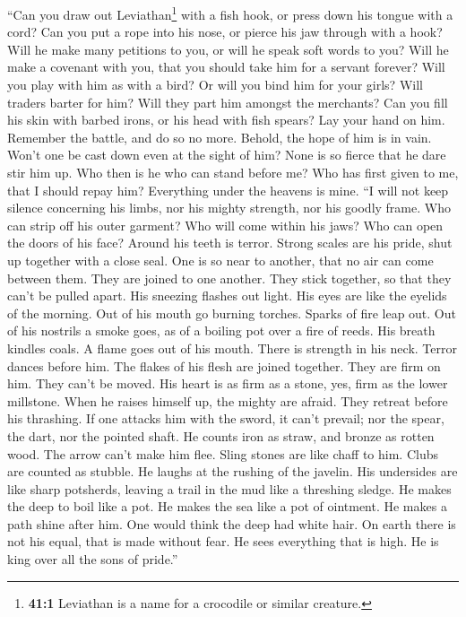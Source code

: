  ``Can you draw out Leviathan\footnote{\textbf{41:1}
  Leviathan is a name for a crocodile or similar creature.} with a fish
hook, or press down his tongue with a cord?  Can you put a
rope into his nose, or pierce his jaw through with a hook?
 Will he make many petitions to you, or will he speak soft
words to you?  Will he make a covenant with you, that you
should take him for a servant forever?  Will you play with
him as with a bird? Or will you bind him for your girls? 
Will traders barter for him? Will they part him amongst the merchants?
 Can you fill his skin with barbed irons, or his head with
fish spears?  Lay your hand on him. Remember the battle,
and do so no more.  Behold, the hope of him is in vain.
Won't one be cast down even at the sight of him?  None is
so fierce that he dare stir him up. Who then is he who can stand before
me?  Who has first given to me, that I should repay him?
Everything under the heavens is mine.  ``I will not keep
silence concerning his limbs, nor his mighty strength, nor his goodly
frame.  Who can strip off his outer garment? Who will
come within his jaws?  Who can open the doors of his
face? Around his teeth is terror.  Strong scales are his
pride, shut up together with a close seal.  One is so
near to another, that no air can come between them.  They
are joined to one another. They stick together, so that they can't be
pulled apart.  His sneezing flashes out light. His eyes
are like the eyelids of the morning.  Out of his mouth go
burning torches. Sparks of fire leap out.  Out of his
nostrils a smoke goes, as of a boiling pot over a fire of reeds.
 His breath kindles coals. A flame goes out of his mouth.
 There is strength in his neck. Terror dances before him.
 The flakes of his flesh are joined together. They are
firm on him. They can't be moved.  His heart is as firm
as a stone, yes, firm as the lower millstone.  When he
raises himself up, the mighty are afraid. They retreat before his
thrashing.  If one attacks him with the sword, it can't
prevail; nor the spear, the dart, nor the pointed shaft. 
He counts iron as straw, and bronze as rotten wood.  The
arrow can't make him flee. Sling stones are like chaff to him.
 Clubs are counted as stubble. He laughs at the rushing
of the javelin.  His undersides are like sharp potsherds,
leaving a trail in the mud like a threshing sledge.  He
makes the deep to boil like a pot. He makes the sea like a pot of
ointment.  He makes a path shine after him. One would
think the deep had white hair.  On earth there is not his
equal, that is made without fear.  He sees everything
that is high. He is king over all the sons of pride.''

